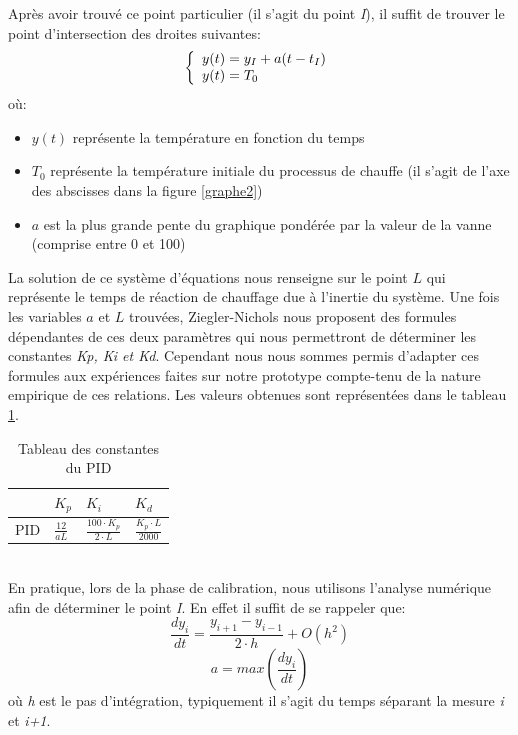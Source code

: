 \documentclass[12pt]{report}
\begin{document}
Après avoir trouvé ce point particulier (il s'agit du point \emph{I}), il suffit de trouver le point d'intersection des droites suivantes:\\
\[\left\{ 
\begin{array}{l l}
y(t) = y_{I} + a (t-t_{I})\\
y(t) = T_{0}\\ 
\end{array} 
\right. \]
où:  \begin{itemize}
\item $y(t)$ représente la température en fonction du temps
\item $T_{0}$ représente la température initiale du processus de chauffe (il s'agit de l'axe des abscisses dans la figure \ref{graphe2})
\item $a$ est la plus grande pente du graphique pondérée par la valeur de la vanne (comprise entre 0 et 100)
\end{itemize}
La solution de ce système d'équations nous renseigne sur le point $L$ qui représente le temps de réaction de chauffage due à l'inertie du système. Une fois les variables $a$ et $L$ trouvées, Ziegler-Nichols nous proposent des formules dépendantes de ces deux paramètres qui nous permettront de déterminer les constantes \emph{Kp, Ki et Kd}. Cependant nous nous sommes permis d'adapter ces formules aux expériences faites sur notre prototype compte-tenu de la nature empirique de ces relations. Les valeurs obtenues sont représentées dans le tableau \ref{tab1}.\\
\begin{table}
\begin{center}
\begin{tabular}{|m{2cm}|m{1cm}|m{1cm}|m{1cm}|}
\hline
 &$K_p$&$K_i$&$K_d$\\
\hline
\vspace{0.5cm}
  {PID}&{$\frac{12}{aL}$}&{$\frac{100\cdot K_p}{2\cdot L}$}&{$\frac{K_p \cdot L}{2000}$}\\
\hline
\end{tabular}
\caption{\label{tab1} Tableau des constantes du PID}
\end{center}
\end{table}\\

En pratique, lors de la phase de calibration, nous utilisons l'analyse numérique afin de déterminer le point \emph{I}. En effet il suffit de se rappeler que:\\
\begin{equation}
\frac{dy_{i}}{dt} = \frac{y_{i+1} - y_{i-1}}{2\cdot h} + O(h^2)
\end{equation}
\begin{equation}
a = max(\frac{dy_i}{dt})
\end{equation}
où 
\emph{h} est le pas d'intégration, typiquement il s'agit du temps séparant la mesure \emph{i} et \emph{i+1}.\\
\end{document}
